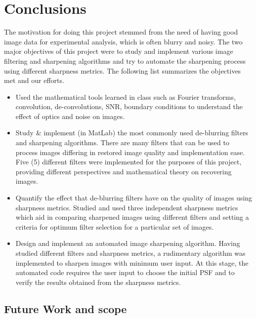 
\section{Conclusions}
The motivation for doing this project stemmed from the need of having good image data for experimental analysis, which is often blurry and noisy. The two major objectives of this project were to study and implement various image filtering and sharpening algorithms and try to automate the sharpening process using different sharpness metrics. The following list summarizes the objectives met and our efforts.

\begin{itemize}
\item Used the mathematical tools learned in class such as Fourier transforms, convolution, de-convolutions, SNR, boundary conditions to understand the effect of optics and noise on images.\\

\item Study \& implement (in MatLab) the most commonly used de-blurring filters and sharpening algorithms. There are many filters that can be used to process images differing in restored image quality and implementation ease. Five (5) different filters were implemented for the purposes of this project, providing different perspectives and mathematical theory on recovering images.\\

\item Quantify the effect that de-blurring filters have on the quality of images using sharpness metrics. Studied and used three independent sharpness metrics which aid in comparing sharpened images using different filters and setting a criteria for optimum filter selection for a particular set of images.\\

\item Design and implement an automated image sharpening algorithm. Having studied different filters and sharpness metrics, a rudimentary algorithm was implemented to sharpen images with minimum user input. At this stage, the automated code requires the user input to choose the initial PSF and to verify the results obtained from the sharpness metrics. 
\end{itemize}

\subsection{ Future Work and scope }

